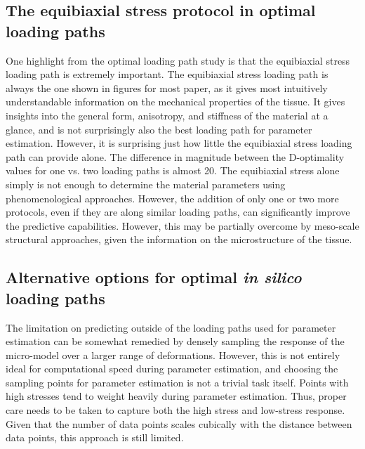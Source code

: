     
    
    
\subsection{The equibiaxial stress protocol in optimal loading paths}

    One highlight from the optimal loading path study is that the equibiaxial stress loading path is extremely important. The equibiaxial stress loading path is always the one shown in figures for most paper, as it gives most intuitively understandable information on the mechanical properties of the tissue. It gives insights into the general form, anisotropy, and stiffness of the material at a glance, and is not surprisingly also the best loading path for parameter estimation. However, it is surprising just how little the equibiaxial stress loading path can provide alone. The difference in magnitude between the D-optimality values for one vs. two loading paths is almost 20. The equibiaxial stress alone simply is not enough to determine the material parameters using phenomenological approaches. However, the addition of only one or two more protocols, even if they are along similar loading paths, can significantly improve the predictive capabilities. However, this may be partially overcome by meso-scale structural approaches, given the information on the microstructure of the tissue.


\subsection{Alternative options for optimal \textit{in silico} loading paths}

    The limitation on predicting outside of the loading paths used for parameter estimation can be somewhat remedied by densely sampling the response of the micro-model over a larger range of deformations. However, this is not entirely ideal for computational speed during parameter estimation, and choosing the sampling points for parameter estimation is not a trivial task itself. Points with high stresses tend to weight heavily during parameter estimation. Thus, proper care needs to be taken to capture both the high stress and low-stress response. Given that the number of data points scales cubically with the distance between data points, this approach is still limited. 

